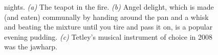 \begin{figure}[t!]
    \begin{subfigure}[t]{0.49\textwidth}
        \centering
        \caption{} \label{jarvist anal}
    \end{subfigure}
    \hfill
    \begin{subfigure}[t]{0.49\textwidth}
        \centering
        \caption{} \label{tetley jawharp}
    \end{subfigure}

    \caption{ nights.
    \textit{(a)} The teapot in the  fire.    \textit{(b)} Angel delight, which is made (and eaten) communally by handing around the pan and a whisk and beating the mixture until you tire and pass it on, is a popular evening pudding.
    \textit{(c)} Tetley's musical instrument of choice in 2008 was the jawharp. }
\end{figure}